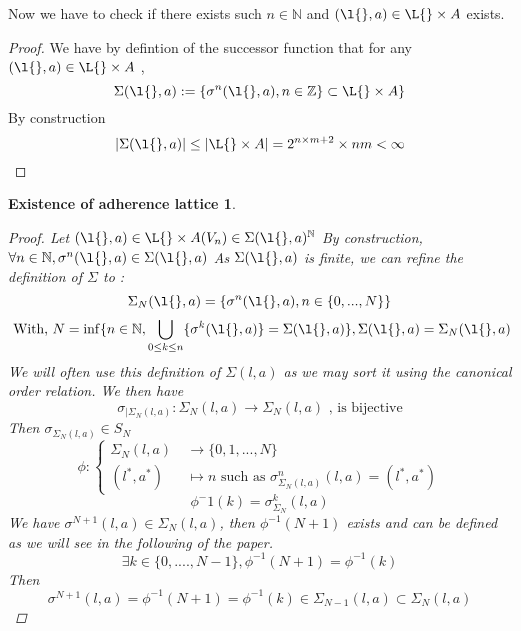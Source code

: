 \documentclass[a4paper,10pt]{article}
\begin{document}
Now we have to check if there exists such $n \in \mathbb{N}$ and $(\l{}, a) \in \L{} \times A$ exists.
\begin{proof}
 We have by defintion of the successor function that for any $(\l{}, a) \in \L{} \times A$ ,
 \begin{equation}
  \Sigma(\l{}, a) := \{ \sigma^n(\l{}, a), n \in \mathbb{Z}\} \subset \L{} \times A \}
 \end{equation}
 By construction
 \begin{equation}
  |\Sigma(\l{}, a)| \leq |\L{} \times A| = 2^{n \times m + 2} \times nm < \infty
  \end{equation}
\end{proof}

\newtheorem{adher}{Existence of adherence lattice}
\begin{adher}
\begin{proof}
 Let $(\l{}, a) \in \L{} \times A (V_n) \in \Sigma(\l{}, a)^\mathbb{N}$
 By construction, $\forall n \in \mathbb{N}, \sigma^n(\l{}, a) \in \Sigma(\l{}, a)$
 As $\Sigma(\l{}, a)$ is finite, we can refine the definition of $\Sigma$ to :
 \begin{equation}
  \Sigma_N(\l{}, a)  = \{ \sigma^n(\l{}, a), n \in \{0, ..., N\} \}
  \end{equation}
  \begin{equation}
   \text{ With,  }N = \inf \{ n \in \mathbb{N}, \bigcup_{ 0 \leq k \leq n } \{ \sigma^k(\l{}, a)\} = \Sigma(\l{}, a)\}, \Sigma(\l{}, a) = \Sigma_N(\l{}, a) 
 \end{equation}
 We will often use this definition of $\Sigma(l, a)$ as we may sort it using the canonical order relation. We then have 
 \begin{equation}
  \sigma_{|\Sigma_N(l, a)} : \Sigma_N(l, a) \longrightarrow \Sigma_N (l, a)\text{ , is bijective}
 \end{equation}
 Then $\sigma_{\Sigma_N(l, a)} \in S_N$
 \begin{equation}
  \phi :\left\{ \begin{array}{rl}
	 \Sigma_N(l, a) &\ \longrightarrow \{0, 1, ..., N \} \\
	 (l^*,a^*) &\ \longmapsto n \text{ such as } \sigma^n_{\Sigma_N(l, a)}( l, a) = (l^*, a^*) 
	 \end{array} \right.
 \end{equation}
 \begin{equation}
  \phi^-1(k) = \sigma^k_{\Sigma_N}(l, a)
 \end{equation}
 We have $\sigma^{N+1}(l, a) \in \Sigma_{N}(l, a)$, then $\phi^{-1}(N + 1)$ exists and can be defined as we will see in the following of the paper.
 \begin{equation}
  \exists k \in \{0, ...., N - 1\}, \phi^{-1}(N+1) = \phi^{-1}(k)
 \end{equation}
 Then 
 \begin{equation}
  \sigma^{N+1}(l, a) = \phi^{-1}(N+1) = \phi^{-1}(k) \in \Sigma_{N-1}(l, a) \subset \Sigma_{N}(l, a)
 \end{equation}








\end{proof}
\end{adher}
\end{document}
